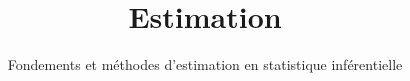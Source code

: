\documentclass{novel}
\title     {Estimation}
\subtitle  {Fondements et méthodes d'estimation en statistique inférentielle}
\numberwithin{equation}{chapter}
\theoremstyle{definition}
\theoremstyle{plain}
\theoremstyle{remark}
\theoremstyle{proof}
\begin{document}
\toc











 



 



\end{document}
